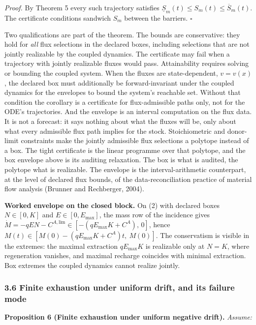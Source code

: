 \documentclass[11pt]{article}
\begin{document}
\emph{Proof.} By Theorem 5 every such trajectory satisfies \(\underline{S}_m(t) \le S_m(t) \le \overline{S}_m(t)\). The certificate conditions sandwich \(S_m\) between the barriers. \ensuremath{\square}

Two qualifications are part of the theorem. The bounds are conservative: they hold for \emph{all} flux selections in the declared boxes, including selections that are not jointly realizable by the coupled dynamics. The certificate may fail when a trajectory with jointly realizable fluxes would pass. Attainability requires solving or bounding the coupled system. When the fluxes are state-dependent, \(v = v(x)\), the declared box must additionally be forward-invariant under the coupled dynamics for the envelopes to bound the system's reachable set. Without that condition the corollary is a certificate for flux-admissible paths only, not for the ODE's trajectories. And the envelope is an interval computation on the flux data. It is not a forecast: it says nothing about what the fluxes will be, only about what every admissible flux path implies for the stock. Stoichiometric and donor-limit constraints make the jointly admissible flux selections a polytope instead of a box. The tight certificate is the linear programme over that polytope, and the box envelope above is its auditing relaxation. The box is what is audited, the polytope what is realizable. The envelope is the interval-arithmetic counterpart, at the level of declared flux bounds, of the data-reconciliation practice of material flow analysis (Brunner and Rechberger, 2004).

\textbf{Worked envelope on the closed block.} On (2) with declared boxes \(N \in [0, K]\) and \(E \in [0, E_{\max}]\), the mass row of the incidence gives \(\dot M = -qEN - C^{A,\mathrm{lim}} \in [-(qE_{\max}K + C^A),\, 0]\), hence \(M(t) \in [M(0) - (qE_{\max}K + C^A)t,\ M(0)]\). The conservatism is visible in the extremes: the maximal extraction \(qE_{\max}K\) is realizable only at \(N = K\), where regeneration vanishes, and maximal recharge coincides with minimal extraction. Box extremes the coupled dynamics cannot realize jointly.

\subsubsection{3.6 Finite exhaustion under uniform drift, and its
failure
mode}\label{finite-exhaustion-under-uniform-drift-and-its-failure-mode}

\textbf{Proposition 6 (Finite exhaustion under uniform negative drift).}
\emph{Assume:}
\end{document}
